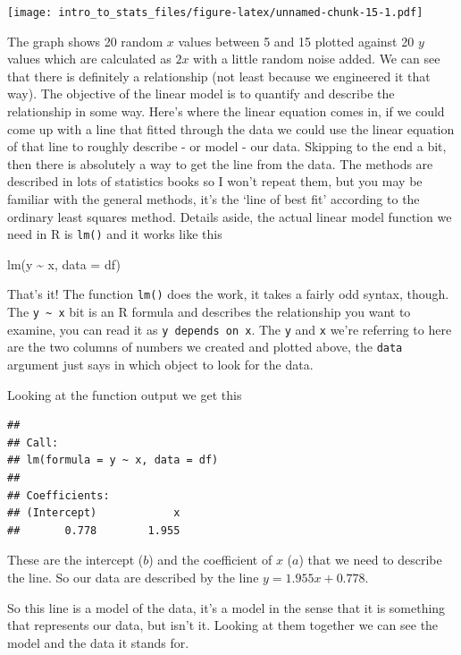 \documentclass[
]{book}
\newenvironment{Shaded}{\begin{snugshade}}{\end{snugshade}}
\newcommand{\AttributeTok}[1]{\textcolor[rgb]{0.77,0.63,0.00}{#1}}
\newcommand{\FunctionTok}[1]{\textcolor[rgb]{0.00,0.00,0.00}{#1}}
\newcommand{\NormalTok}[1]{#1}
\newcommand{\SpecialCharTok}[1]{\textcolor[rgb]{0.00,0.00,0.00}{#1}}
\begin{document}
\texttt{[image: intro\_to\_stats\_files/figure-latex/unnamed-chunk-15-1.pdf]}

The graph shows 20 random \(x\) values between 5 and 15 plotted against 20 \(y\) values which are calculated as \(2x\) with a little random noise added. We can see that there is definitely a relationship (not least because we engineered it that way). The objective of the linear model is to quantify and describe the relationship in some way. Here's where the linear equation comes in, if we could come up with a line that fitted through the data we could use the linear equation of that line to roughly describe - or model - our data. Skipping to the end a bit, then there is absolutely a way to get the line from the data. The methods are described in lots of statistics books so I won't repeat them, but you may be familiar with the general methods, it's the `line of best fit' according to the ordinary least squares method. Details aside, the actual linear model function we need in R is \texttt{lm()} and it works like this

\begin{Shaded}
\begin{Highlighting}[]
\FunctionTok{lm}\NormalTok{(y }\SpecialCharTok{\textasciitilde{}}\NormalTok{ x, }\AttributeTok{data =}\NormalTok{ df)}
\end{Highlighting}
\end{Shaded}

That's it! The function \texttt{lm()} does the work, it takes a fairly odd syntax, though. The \texttt{y\ \textasciitilde{}\ x} bit is an R formula and describes the relationship you want to examine, you can read it as \texttt{y\ depends\ on\ x}. The \texttt{y} and \texttt{x} we're referring to here are the two columns of numbers we created and plotted above, the \texttt{data} argument just says in which object to look for the data.

Looking at the function output we get this

\begin{verbatim}
## 
## Call:
## lm(formula = y ~ x, data = df)
## 
## Coefficients:
## (Intercept)            x  
##       0.778        1.955
\end{verbatim}

These are the intercept (\(b\)) and the coefficient of \(x\) (\(a\)) that we need to describe the line. So our data are described by the line \(y = 1.955x + 0.778\).

So this line is a model of the data, it's a model in the sense that it is something that represents our data, but isn't it. Looking at them together we can see the model and the data it stands for.
\end{document}
